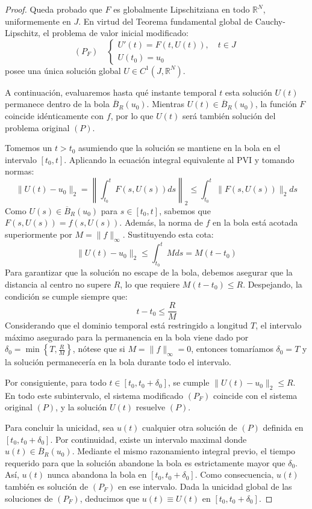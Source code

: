 \begin{proof}
    Queda probado que $F$ es globalmente Lipschitziana en todo $\mathbb{R}^N$, uniformemente en $J$. En virtud del Teorema fundamental global de Cauchy-Lipschitz, el problema de valor inicial modificado:
    \[
        (P_F) \quad \begin{cases}
            U'(t) = F(t, U(t)), \quad t \in J \\
            U(t_0) = u_0
        \end{cases}
    \]
    posee una única solución global $U \in C^1(J, \mathbb{R}^N)$.
    
    A continuación, evaluaremos hasta qué instante temporal $t$ esta solución $U(t)$ permanece dentro de la bola $\overline{B}_R(u_0)$. Mientras $U(t) \in \overline{B}_R(u_0)$, la función $F$ coincide idénticamente con $f$, por lo que $U(t)$ será también solución del problema original $(P)$.
    
    Tomemos un $t > t_0$ asumiendo que la solución se mantiene en la bola en el intervalo $[t_0, t]$. Aplicando la ecuación integral equivalente al PVI y tomando normas:
    \[
        \| U(t) - u_0 \|_2 = \left\| \int_{t_0}^t F(s, U(s)) ds \right\|_2 \leq \int_{t_0}^t \| F(s, U(s)) \|_2 ds
    \]
    Como $U(s) \in \overline{B}_R(u_0)$ para $s \in [t_0, t]$, sabemos que $F(s, U(s)) = f(s, U(s))$. Además, la norma de $f$ en la bola está acotada superiormente por $M = \| f \|_\infty$. Sustituyendo esta cota:
    \[
        \| U(t) - u_0 \|_2 \leq \int_{t_0}^t M ds = M (t - t_0)
    \]
    Para garantizar que la solución no escape de la bola, debemos asegurar que la distancia al centro no supere $R$, lo que requiere $M (t - t_0) \leq R$. Despejando, la condición se cumple siempre que:
    \[
        t - t_0 \leq \frac{R}{M}
    \]
    Considerando que el dominio temporal está restringido a longitud $T$, el intervalo máximo asegurado para la permanencia en la bola viene dado por $\delta_0 = \min \left\{ T, \frac{R}{M} \right\}$, nótese que si $M=\| f \|_\infty = 0$, entonces tomaríamos $\delta_0 = T$ y la solución permanecería en la bola durante todo el intervalo.
    
    Por consiguiente, para todo $t \in [t_0, t_0 + \delta_0]$, se cumple $\| U(t) - u_0 \|_2 \leq R$. En todo este subintervalo, el sistema modificado $(P_F)$ coincide con el sistema original $(P)$, y la solución $U(t)$ resuelve $(P)$. 
    
    Para concluir la unicidad, sea $u(t)$ cualquier otra solución de $(P)$ definida en $[t_0, t_0 + \delta_0]$. Por continuidad, existe un intervalo maximal donde $u(t) \in \overline{B}_R(u_0)$. Mediante el mismo razonamiento integral previo, el tiempo requerido para que la solución abandone la bola es estrictamente mayor que $\delta_0$. Así, $u(t)$ nunca abandona la bola en $[t_0, t_0 + \delta_0]$. Como consecuencia, $u(t)$ también es solución de $(P_F)$ en ese intervalo. Dada la unicidad global de las soluciones de $(P_F)$, deducimos que $u(t) \equiv U(t)$ en $[t_0, t_0 + \delta_0]$.


\end{proof}
